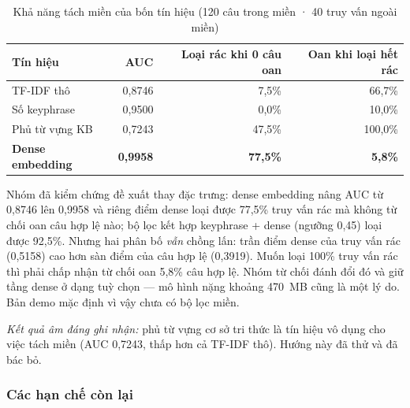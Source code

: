 \begin{table}[H]
\centering
\caption{Khả năng tách miền của bốn tín hiệu (120 câu trong miền · 40 truy vấn ngoài miền)}
\label{tab:tach-mien}
\renewcommand{\arraystretch}{1.2}
\begin{tabularx}{\textwidth}{@{}L r r r@{}}
\toprule
\textbf{Tín hiệu} & \textbf{AUC} & \textbf{Loại rác khi 0 câu oan} & \textbf{Oan khi loại hết rác} \\
\midrule
TF-IDF thô       & 0,8746 & 7,5\%  & 66,7\% \\
Số keyphrase     & 0,9500 & 0,0\%  & 10,0\% \\
Phủ từ vựng KB   & 0,7243 & 47,5\% & 100,0\% \\
\textbf{Dense embedding} & \textbf{0,9958} & \textbf{77,5\%} & \textbf{5,8\%} \\
\bottomrule
\end{tabularx}
\end{table}

Nhóm đã kiểm chứng đề xuất thay đặc trưng: dense embedding nâng AUC từ 0,8746 lên 0,9958 và
riêng điểm dense loại được 77,5\% truy vấn rác mà không từ chối oan câu hợp lệ nào; bộ lọc kết
hợp keyphrase + dense (ngưỡng 0,45) loại được 92,5\%. Nhưng hai phân bố \emph{vẫn} chồng lấn:
trần điểm dense của truy vấn rác (0,5158) cao hơn sàn điểm của câu hợp lệ (0,3919). Muốn loại
100\% truy vấn rác thì phải chấp nhận từ chối oan 5,8\% câu hợp lệ. Nhóm từ chối đánh đổi đó và
giữ tầng dense ở dạng tuỳ chọn --- mô hình nặng khoảng 470~MB cũng là một lý do. Bản demo mặc
định vì vậy chưa có bộ lọc miền.

\emph{Kết quả âm đáng ghi nhận:} phủ từ vựng cơ sở tri thức là tín hiệu vô dụng cho việc tách
miền (AUC 0,7243, thấp hơn cả TF-IDF thô). Hướng này đã thử và đã bác bỏ.

\subsubsection{Các hạn chế còn lại}

